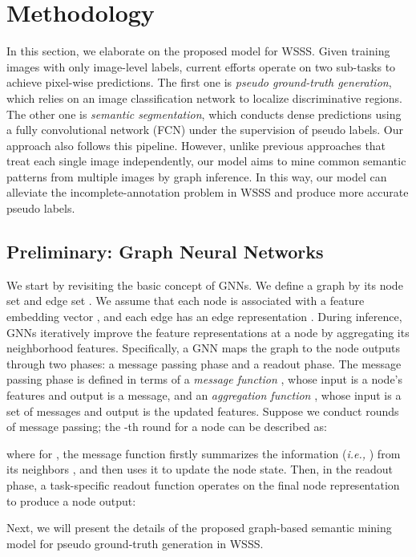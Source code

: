\documentclass[letterpaper]{article} \usepackage{aaai21}  \usepackage{times}  \usepackage{helvet} \usepackage{courier}  \usepackage[hyphens]{url}  \usepackage{graphicx} \urlstyle{rm} \def\UrlFont{\rm}  \usepackage{graphicx}  \usepackage{natbib}  \usepackage{caption} \frenchspacing  \setlength{\pdfpagewidth}{8.5in}  \setlength{\pdfpageheight}{11in}
\newcommand{\ie}[1]{\textit{i.e.,}}
\begin{document}
\section{Methodology}

In this section, we elaborate on the proposed model for WSSS. Given training images with only image-level labels, current efforts operate on two sub-tasks to achieve pixel-wise predictions. The first one is \textit{pseudo ground-truth generation}, which relies on an image classification network to localize discriminative regions. The other one is \textit{semantic segmentation}, which conducts dense predictions using a fully convolutional network (FCN) under the supervision of pseudo labels. Our approach also follows this pipeline. However, unlike previous approaches that treat each single image independently, our model aims to mine common semantic patterns from multiple images by graph inference. In this way, our model can alleviate the incomplete-annotation problem in WSSS and produce more accurate pseudo labels.





\subsection{Preliminary: Graph Neural Networks}
We start by revisiting the basic concept of GNNs. We define a graph  by its node set  and edge set . We assume that each node  is associated with a feature embedding vector , and each edge  has an edge representation . During inference, GNNs iteratively improve the feature representations at a node by aggregating its neighborhood features. Specifically, a GNN maps the graph  to the node outputs through two phases: a message passing phase and a readout phase. The message passing phase is defined in terms of a \textit{message function} , whose input is a node's features and output is a message, and an \textit{aggregation function} , whose input is a set of messages and output is the updated features. Suppose we conduct  rounds of message passing; the -th round for a node  can be described as:

where for , the message function firstly summarizes the information (\ie, ) from its neighbors , and then uses it to update the node state. Then, in the readout phase, a task-specific readout function  operates on the final node representation  to produce a node output:


Next, we will present the details of the proposed graph-based semantic mining model for pseudo ground-truth generation in WSSS.
\end{document}
